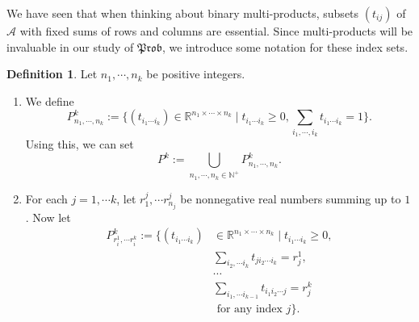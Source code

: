 \documentclass[a4paper]{amsproc}
\theoremstyle{plain}
\theoremstyle{definition}
\newtheorem{definition}[theorem]{Definition}
\theoremstyle{remark}
\numberwithin{equation}{section}
\newcommand{\Prob}{\mathfrak{Prob}}
\begin{document}
We have seen that when thinking about binary multi-products, subsets $(t_{ij})$ of $\mathcal{A}$ with fixed sums of rows and columns are essential. Since multi-products will be invaluable in our study of $\Prob$, we introduce some notation for these index sets.

\begin{definition}
    Let $n_1, \cdots, n_k$ be positive integers.
    \begin{enumerate}
        \item We define
        \begin{equation*}
            P^k_{n_1,\cdots,n_k} := \{ (t_{i_1 \cdots i_k}) \in \mathbb{R}^{n_1 \times \cdots \times n_k} \mid t_{i_1 \cdots i_k} \geq 0, \sum_{i_1,\cdots,i_k} t_{i_1 \cdots i_k} = 1 \} .
        \end{equation*}
        Using this, we can set
        \[
            P^k := \bigcup_{n_1,\cdots, n_k \in \mathbb{N}^+} P^k_{n_1,\cdots,n_k} .
        \]
        \item For each $j = 1, \cdots k$, let $r^j_1, \cdots r^j_{n_j}$ be nonnegative real numbers summing up to $1$. Now let
        \begin{equation*}
            \begin{split}
                P^k_{r_i^1,\cdots r_i^k} := \{ (t_{i_1 \cdots i_k}) &\in \mathbb{R}^{n_1 \times \cdots \times n_k} \mid t_{i_1 \cdots i_k} \geq 0, \\
                & \sum_{i_2,\cdots i_k} t_{j i_2 \cdots i_k} = r^1_j, \\
                & \cdots \\
                & \sum_{i_1,\cdots i_{k-1}} t_{i_1 i_2 \cdots j} = r^k_j \\
                & \text{ for any index } j \} .
            \end{split}
        \end{equation*}
    \end{enumerate}
\end{definition}
\end{document}
